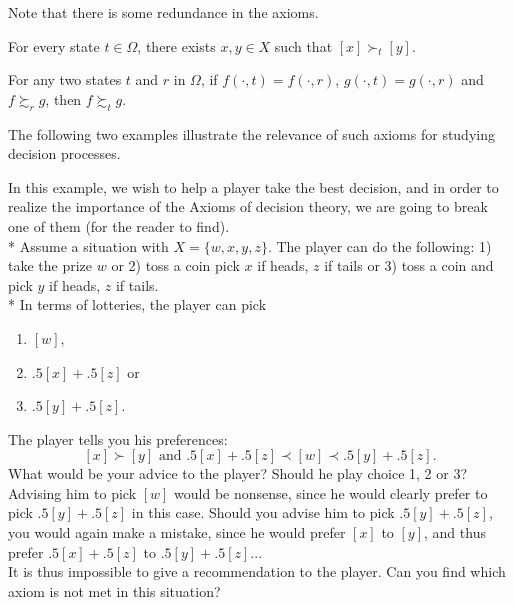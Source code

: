 Note that there is some redundance in the axioms.

\begin{axiom}[Interest]
For every state $t \in \Omega$, there exists $x, y \in X$ such that $[x] \succ_t [y]$.
\label{ch1axint}
\end{axiom}

\begin{axiom}
For any two states $t$ and $r$ in $\Omega$, if $f(\cdot, t) = f(\cdot, r) $, $g(\cdot, t) = g(\cdot, r) $ and $f \succsim_r g$, then $f \succsim_t g$.
\label{ch1:ax:sn}
\end{axiom}

The following two examples illustrate the relevance of such axioms for studying decision processes.
\begin{example}
\label{ch1:nosubs}
In this example, we wish to help a player take the best decision, and in order to realize the importance of the Axioms of decision theory, we are going to break one of them (for the reader to find).  \\*
Assume a situation with $X = \{w,x,y,z\}$.
The player can do the following: 1) take the prize $w$ or 2) toss a coin  pick $x$ if heads, $z$ if tails or 3) toss a coin and pick  $y$ if heads, $z$ if tails.\\*
In terms of lotteries, the player can pick
\begin{enumerate}
\item $[w]$,
\item $.5[x]+.5[z]$ or
\item $.5[y]+.5[z]$.
\end{enumerate}
The player tells you his preferences:
$$[x] \succ [y] \text{ and } .5[x]+.5[z] \prec [w] \prec.5[y]+.5[z].$$
What would be your advice to the player? Should he play choice 1, 2 or 3?\\
Advising him to pick $[w]$ would be nonsense, since he would clearly prefer to pick $.5[y]+.5[z]$ in this case. Should you advise him to pick $.5[y]+.5[z]$, you would again make a mistake, since he would prefer $[x]$ to $[y]$, and thus prefer $.5[x]+.5[z]$ to $.5[y]+.5[z]$...\\
It is thus impossible to give a recommendation to the player. Can you find which axiom is not met in this situation?
\end{example}

